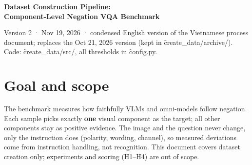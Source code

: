 \documentclass[10.5pt]{article}
\begin{document}
\sloppy

{\LARGE\bfseries\color{headblue} Dataset Construction Pipeline:\\[2pt] Component-Level Negation VQA Benchmark}

\vspace{4pt}
{\small Version 2 · Nov 19, 2026 · condensed English version of the Vietnamese process document; replaces the
Oct 21, 2026 version (kept in \f{create\_data/archive/}). Code: \f{create\_data/src/}, all thresholds in
\f{config.py}.}

\vspace{6pt}

\section{Goal and scope}
The benchmark measures how faithfully VLMs and omni-models follow negation. Each sample picks exactly
\textbf{one} visual component as the target; all other components stay as positive evidence. The image and the
question never change, only the instruction does (polarity, wording, channel), so measured deviations come
from instruction handling, not recognition. This document covers dataset creation only; experiments and scoring
(H1--H4) are out of scope.
\end{document}
